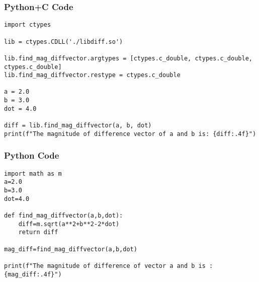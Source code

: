 \documentclass{beamer}
\begin{document}
\begin{frame}[fragile]
    \frametitle{Python+C Code}
    \begin{lstlisting}
import ctypes

lib = ctypes.CDLL('./libdiff.so')

lib.find_mag_diffvector.argtypes = [ctypes.c_double, ctypes.c_double, ctypes.c_double]
lib.find_mag_diffvector.restype = ctypes.c_double

a = 2.0
b = 3.0
dot = 4.0

diff = lib.find_mag_diffvector(a, b, dot)
print(f"The magnitude of difference vector of a and b is: {diff:.4f}")

    \end{lstlisting}
\end{frame}



\begin{frame}[fragile]
    \frametitle{Python Code}
    \begin{lstlisting}
import math as m
a=2.0
b=3.0
dot=4.0

def find_mag_diffvector(a,b,dot):
    diff=m.sqrt(a**2+b**2-2*dot)
    return diff

mag_diff=find_mag_diffvector(a,b,dot)

print(f"The magnitude of difference of vector a and b is :{mag_diff:.4f}")
    \end{lstlisting}
\end{frame}
\end{document}

